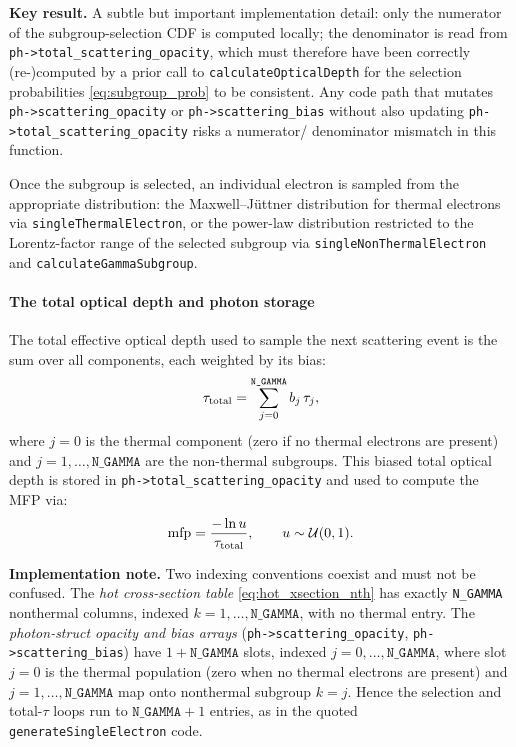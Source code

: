 \documentclass[12pt,a4paper]{article}
\newcommand{\code}[1]{\texttt{#1}}
\newenvironment{keyresult}{%
	\begin{framed}\noindent\textbf{Key result.}\quad}
	{\end{framed}}
\newenvironment{implementationnote}{%
	\begin{framed}\noindent\textbf{Implementation note.}\quad}
	{\end{framed}}
\begin{document}
\begin{keyresult}
	A subtle but important implementation detail: only
	the numerator of the subgroup-selection CDF is computed locally; the
	denominator is read from \code{ph->total\_scattering\_opacity}, which
	must therefore have been correctly (re-)computed by a prior call to
	\code{calculateOpticalDepth} for the selection probabilities
	\eqref{eq:subgroup_prob} to be consistent. Any code path that mutates
	\code{ph->scattering\_opacity} or \code{ph->scattering\_bias} without
	also updating \code{ph->total\_scattering\_opacity} risks a numerator/
	denominator mismatch in this function.
\end{keyresult}

Once the subgroup is selected, an individual electron is sampled from
the appropriate distribution: the Maxwell--J\"{u}ttner distribution for
thermal electrons via \code{singleThermalElectron}, or the power-law
distribution restricted to the Lorentz-factor range of the selected
subgroup via \code{singleNonThermalElectron} and
\code{calculateGammaSubgroup}.

\paragraph{The total optical depth and photon storage}
\label{sec:total_tau}

The total effective optical depth used to sample the next scattering
event is the sum over all components, each weighted by its bias:
\begin{equation}
	\tau_{\rm total} = \sum_{j=0}^{\code{N\_GAMMA}} b_j\,\tau_j,
	\label{eq:tau_total}
\end{equation}
where $j = 0$ is the thermal component (zero if no thermal electrons are
present) and $j = 1,\ldots,\code{N\_GAMMA}$ are the non-thermal subgroups.
This biased total optical depth is stored in
\code{ph->total\_scattering\_opacity} and used to compute the MFP via:
\begin{equation}
	\mathrm{mfp} = \frac{-\ln u}{\tau_{\rm total}}, \qquad
	u \sim \mathcal{U}(0,1).
	\label{eq:mfp_total_opacity}
\end{equation}

\begin{implementationnote}
	Two indexing conventions coexist and must not be confused. The
	\emph{hot cross-section table} \eqref{eq:hot_xsection_nth} has exactly
	\code{N\_GAMMA} nonthermal columns, indexed $k=1,\ldots,\code{N\_GAMMA}$,
	with no thermal entry. The \emph{photon-struct opacity and bias arrays}
	(\code{ph->scattering\_opacity}, \code{ph->scattering\_bias}) have
	$1+\code{N\_GAMMA}$ slots, indexed $j=0,\ldots,\code{N\_GAMMA}$, where
	slot $j=0$ is the thermal population (zero when no thermal electrons are
	present) and $j=1,\ldots,\code{N\_GAMMA}$ map onto nonthermal subgroup
	$k=j$. Hence the selection and total-$\tau$ loops run to $\code{N\_GAMMA}+1$
	entries, as in the quoted \code{generateSingleElectron} code.
\end{implementationnote}
\end{document}
